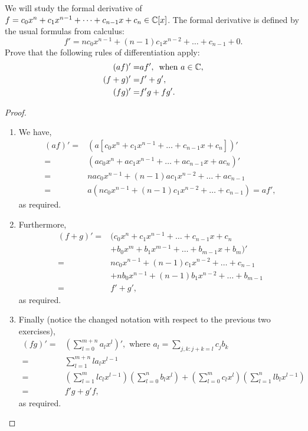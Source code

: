 \begin{exercise}{13}
We will study the formal derivative of $f=c_0x^n+c_1x^{n-1}+\dots+c_{n-1}x+c_n\in\mathbb{C}[x]$. The formal derivative is defined by the usual formulas from calculus:
\[
f'=nc_0x^{n-1}+(n-1)c_1x^{n-2}+\dots+c_{n-1}+0.
\]
Prove that the following rules of differentiation apply:
\begin{align*}
    (af)' =& af',\, \text{ when } a\in\mathbb{C},\\
    (f+g)' =& f' + g',\\
    (fg)' =& f'g + fg'.
\end{align*}
\end{exercise}
\begin{proof}
\begin{enumerate}
    \item We have,
    \begin{align*}
        (af)' =& (a[c_0x^n+c_1x^{n-1}+\dots+c_{n-1}x+c_n])'\\ 
        =& (ac_0x^n+ac_1x^{n-1}+\dots+ac_{n-1}x+ac_n)'\\
        =& nac_0x^{n-1}+(n-1)ac_1x^{n-2}+\dots+ac_{n-1}\\ =& a(nc_0x^{n-1}+(n-1)c_1x^{n-2}+\dots+c_{n-1}) =af',
    \end{align*}
    as required.
    \item Furthermore,
    \begin{align*}
        (f+g)' =& (c_0x^n+c_1x^{n-1}+\dots+c_{n-1}x+c_n\\ &+b_0x^m+b_1x^{m-1}+\dots+b_{m-1}x+b_m)'\\
        =& nc_0x^{n-1}+(n-1)c_1x^{n-2}+\dots+c_{n-1}\\
        &+ nb_0x^{n-1}+(n-1)b_1x^{n-2}+\dots+b_{m-1}\\
        =& f' + g',
    \end{align*}
    as required.
    \item Finally (notice the changed notation with respect to the previous two exercises),
    \begin{align*}
        (fg)' =& (\sum_{l=0}^{m+n}a_lx^l)',\text{ where }a_l=\sum_{j,k: j+k=l}c_jb_k\\
        =& \sum_{l=1}^{m+n}la_lx^{l-1}\\
        =& (\sum_{l=1}^{m}lc_lx^{l-1})(\sum_{l=0}^{n}b_lx^{l}) + (\sum_{l=0}^{m}c_lx^{l})(\sum_{l=1}^{n}lb_lx^{l-1})\\
        =& f'g + g'f,
    \end{align*}
    as required.
\end{enumerate}
\end{proof}

